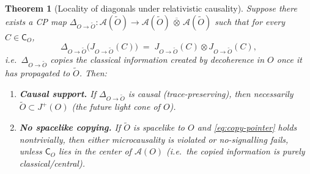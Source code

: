 \documentclass[11pt]{article}
\theoremstyle{upright}
\newtheorem{theorem}{Theorem}
\begin{document}
\begin{theorem}[Locality of diagonals under relativistic causality]
\label{thm:local-diagonal-refined}
Suppose there exists a CP map $\Delta_{O\to \tilde O}:\mathcal{A}(\tilde O)\to \mathcal{A}(\tilde O)\,\overline{\otimes}\,\mathcal{A}(\tilde O)$ such that for every $C\in \mathsf{C}_O$,
\begin{equation}\label{eq:copy-pointer}
\Delta_{O\to \tilde O}\!\big(J_{O\to \tilde O}(C)\big)
\;=\;
J_{O\to \tilde O}(C)\otimes J_{O\to \tilde O}(C),
\end{equation}
i.e.\ $\Delta_{O\to \tilde O}$ \emph{copies} the classical information created by decoherence in $O$ once it has propagated to $\tilde O$. Then:
\begin{enumerate}
\item \textbf{Causal support.} If $\Delta_{O\to \tilde O}$ is causal (trace-preserving), then necessarily $\tilde O \subset J^+(O)$ (the future light cone of $O$).
\item \textbf{No spacelike copying.} If $\tilde O$ is spacelike to $O$ and \eqref{eq:copy-pointer} holds nontrivially, then either microcausality is violated or no-signalling fails, unless $\mathsf{C}_O$ lies in the center of $\mathcal{A}(O)$ (i.e.\ the copied information is purely classical/central).
\end{enumerate}
\end{theorem}
\end{document}
